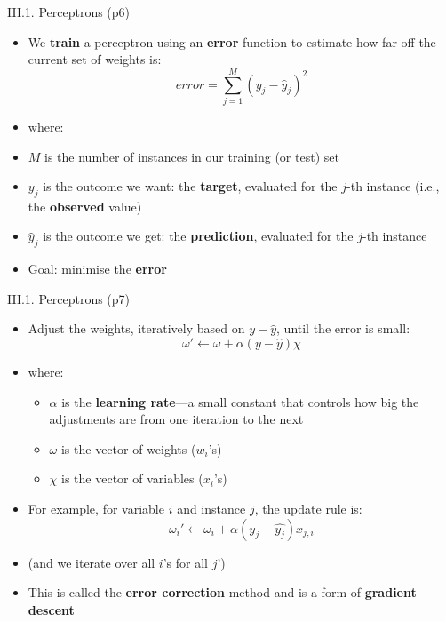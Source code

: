 \documentclass[handout]{beamer}
\newcommand{\strong}[1]{\textbf{\color{teal} #1}}
\newcommand{\stronger}[1]{\textbf{\color{purple} #1}}
\begin{document}
\begin{frame}{III.1. Perceptrons (p6)}
\begin{itemize}
\item We \stronger{train} a perceptron using an \strong{error} function to estimate how far off the current set of weights is:
\[
error = \sum_{j=1}^{M}( y_j - \hat{y}_j )^2
\]
\item[] where:
\item $M$ is the number of instances in our training (or test) set
\item $y_j$ is the outcome we want: the \strong{target}, evaluated for the $j$-th instance (i.e., the \strong{observed} value)
\item $\hat{y}_j$ is the outcome we get: the \strong{prediction}, evaluated for the $j$-th instance
\item Goal: minimise the \strong{error}
\end{itemize}
\end{frame}
\begin{frame}{III.1. Perceptrons (p7)}
\begin{itemize}
\item Adjust the weights, iteratively based on $y - \hat{y}$, until the error is small:
\[
	\omega' \leftarrow \omega + \alpha( y - \hat{y} ) \chi
\]
\item[] where:
	\begin{itemize}
	\item $\alpha$ is the \strong{learning rate}---a small constant that controls how big the adjustments are from one iteration to the next
	\item $\omega$ is the vector of weights ($w_i$'s)
	\item $\chi$ is the vector of variables ($x_i$'s)
	\end{itemize}
\item For example, for variable $i$ and instance $j$, the update rule is:
\[
	\omega_i' \leftarrow \omega_i + \alpha( y_j - \hat{y_j} ) x_{j,i}
\]
\item[] (and we iterate over all $i$'s for all $j$')
\item This is called the \strong{error correction} method and is a form of \stronger{gradient descent}
\end{itemize}
\end{frame}
\end{document}
